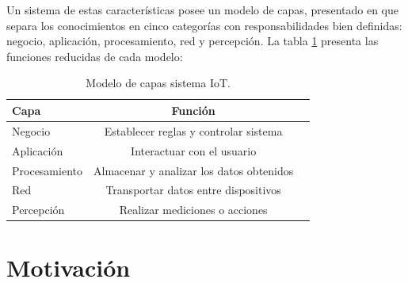 Un sistema de estas características posee un modelo de capas, presentado en \citep{ARTICLE:4} que separa los conocimientos en cinco categorías con responsabilidades bien definidas: negocio, aplicación, procesamiento, red y percepción. La tabla \ref{tab:Modelo} presenta las funciones reducidas de cada modelo:


\begin{table}[h]
	\centering
	\caption[Modelo de capas IoT]{Modelo de capas sistema IoT.}
	\begin{tabular}{l c c}    
		\toprule
		\textbf{Capa}     & \textbf{Función} \\
		\midrule
		Negocio & Establecer reglas y controlar sistema    \\		
		Aplicación    & Interactuar con el usuario           \\
		Procesamiento  & Almacenar y analizar los datos obtenidos  \\
		Red  & Transportar datos entre dispositivos      \\
		Percepción \citep{ARTICLE:4}  & Realizar mediciones o acciones\\
		\bottomrule
		\hline
	\end{tabular}
	\label{tab:Modelo}
\end{table}






\section{Motivación}
\label{Motivación}



